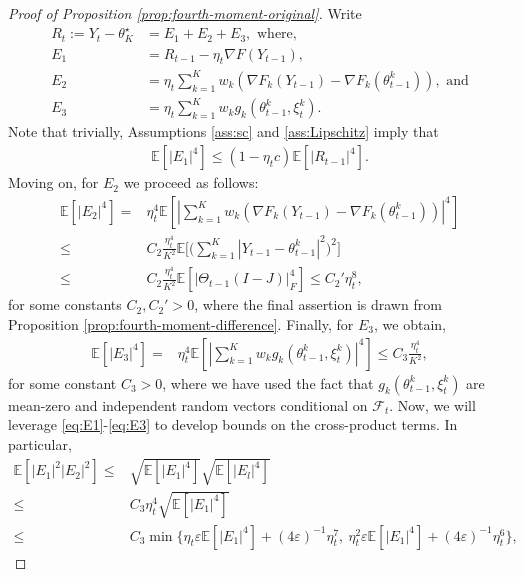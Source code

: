\documentclass[10pt,a4paper]{amsart}
\def\IE{\mathbb{E}}
\newcommand{\minparam}{\theta^\star_K}
\begin{document}
\begin{proof}[Proof of Proposition \ref{prop:fourth-moment-original}]
    Write  
\begin{align}
    R_t:=Y_t - \minparam &= E_1 + E_2 + E_3, \text{ where},\nonumber\\
    E_1 & = R_{t-1} - \eta_t\nabla F(Y_{t-1}) , \nonumber\\
    E_2 &= \eta_t \sum_{k=1}^K w_k (\nabla F_k(Y_{t-1}) - \nabla F_k(\theta_{t-1}^k)),  \text{ and} \nonumber\\
    E_3 &= \eta_t \sum_{k=1}^K w_k g_k(\theta_{t-1}^k, \xi_t^k). \label{eq:foruth-moment-decomp}
\end{align}
Note that trivially, Assumptions \ref{ass:sc} and \ref{ass:Lipschitz} imply that 
\begin{align}
    \IE[|E_1|^4] \leq (1- \eta_t c)\IE[|R_{t-1}|^4] \label{eq:E1}.
\end{align}
Moving on, for $E_2$ we proceed as follows:
\begin{align}
    \IE[|E_2|^4] = & \eta_t^4 \IE[|\sum_{k=1}^K w_k(\nabla F_k(Y_{t-1}) - \nabla F_k(\theta_{t-1}^k))|^4] \nonumber\\
    \leq & C_2\frac{\eta_t^4}{K^2} \IE\bigg[ \Big( \sum_{k=1}^K |Y_{t-1} - \theta_{t-1}^k|^2 \Big)^2 \bigg] \nonumber\\
    \leq & C_2\frac{\eta_t^4}{K^2} \IE[|\Theta_{t-1}(I-J)|_F^4] \leq C_2'{\eta_t^8} \label{eq:E2},
\end{align}
for some constants $C_2, C_2'>0$, where the final assertion is drawn from Proposition \ref{prop:fourth-moment-difference}. Finally, for $E_3$, we obtain,
\begin{align}
    \IE[|E_3|^4] = & \eta_t^4 \IE[|\sum_{k=1}^K w_k g_k(\theta_{t-1}^k, \xi_t^k)|^4] \leq  C_3 \frac{\eta_t^4}{K^2} \label{eq:E3},
\end{align}
 for some constant $C_3>0$, where we have used the fact that $g_k(\theta_{t-1}^k, \xi_t^k)$ are mean-zero and independent random vectors conditional on $\mathcal{F}_t$. Now, we will leverage \eqref{eq:E1}-\eqref{eq:E3} to develop bounds on the cross-product terms. In particular,
\begin{align}
    \IE[|E_1|^2 |E_2|^2] \leq & \sqrt{\IE[|E_1|^4]} \sqrt{\IE[|E_l|^4]} \nonumber\\
    \leq  & C_3 \eta_t^4 \sqrt{\IE[|E_1|^4]} \nonumber\\
    \leq & C_3 \min\{\eta_t \varepsilon \IE[|E_1|^4] + (4\varepsilon)^{-1} \eta_t^7 , \  \eta_t^2 \varepsilon \IE[|E_1|^4] + (4\varepsilon)^{-1}  \eta_t^6\}, \label{eq:E1-cross-prods-1}

\end{align}
\end{proof}
\end{document}
